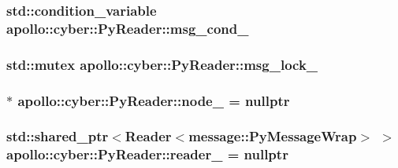 \hypertarget{classapollo_1_1cyber_1_1PyReader_afef93e420ce1fe81783ee2e533aff74b}{
\subsubsection[{msg\-\_\-cond\-\_\-}]{\setlength{\rightskip}{0pt plus 5cm}std\-::condition\-\_\-variable apollo\-::cyber\-::\-Py\-Reader\-::msg\-\_\-cond\-\_\-\hspace{0.3cm}{\ttfamily [private]}}}\label{classapollo_1_1cyber_1_1PyReader_afef93e420ce1fe81783ee2e533aff74b}
\hypertarget{classapollo_1_1cyber_1_1PyReader_a65d8b0d144d43363766a7b30739d3ae9}{
\subsubsection[{msg\-\_\-lock\-\_\-}]{\setlength{\rightskip}{0pt plus 5cm}std\-::mutex apollo\-::cyber\-::\-Py\-Reader\-::msg\-\_\-lock\-\_\-\hspace{0.3cm}{\ttfamily [private]}}}\label{classapollo_1_1cyber_1_1PyReader_a65d8b0d144d43363766a7b30739d3ae9}
\hypertarget{classapollo_1_1cyber_1_1PyReader_a536eec8704c82a257a9d5055ce423186}{
\subsubsection[{node\-\_\-}]{$\ast$ apollo\-::cyber\-::\-Py\-Reader\-::node\-\_\- = nullptr\hspace{0.3cm}{\ttfamily [private]}}}\label{classapollo_1_1cyber_1_1PyReader_a536eec8704c82a257a9d5055ce423186}
\hypertarget{classapollo_1_1cyber_1_1PyReader_abf457a5943e3bb6e4ad42349ff864688}{
\subsubsection[{reader\-\_\-}]{\setlength{\rightskip}{0pt plus 5cm}std\-::shared\-\_\-ptr$<${\bf Reader}$<${\bf message\-::\-Py\-Message\-Wrap}$>$ $>$ apollo\-::cyber\-::\-Py\-Reader\-::reader\-\_\- = nullptr\hspace{0.3cm}{\ttfamily [private]}}}\label{classapollo_1_1cyber_1_1PyReader_abf457a5943e3bb6e4ad42349ff864688}
